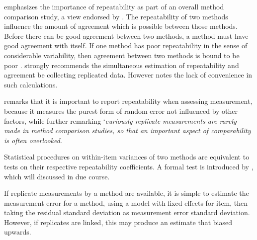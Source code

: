 \documentclass[12pt, a4paper]{report}
\theoremstyle{plain}
\theoremstyle{definition}
\theoremstyle{remark}
\begin{document}


\citet{Barnhart} emphasizes the importance of repeatability as part of an overall method comparison study, a view endorsed by \citet{BXC2008}. The repeatability of two methods influence the amount of agreement which is possible between those methods. Before there can be good agreement between two methods, a method must have good agreement with itself. If one method has poor repeatability in the sense of considerable variability, then agreement between two methods is bound to be poor \citep{Ba99, ARoy2009}.
\citet{BA99} strongly recommends the simultaneous estimation of repeatability and agreement be collecting replicated data.
However \citet{ARoy2009} notes the lack of convenience in such calculations. 

% 

	

	\citet{Barnhart} remarks that it is important to report repeatability when assessing
	measurement, because it measures the purest form of random error
	not influenced by other factors, while further remarking `\textit{curiously replicate measurements are rarely made in method comparison studies, so that an important aspect of comparability is often overlooked}. 
	
	
		
Statistical procedures on within-item variances of two methods are equivalent to tests on their respective repeatability coefficients. A formal test is introduced by \citet{ARoy2009}, which will discussed in due course.
		
	
	If replicate measurements by a method are available, it is simple to estimate the measurement error for a method, using a model with fixed effects for item, then taking the residual standard deviation as measurement error standard deviation. However, if replicates are linked, this may produce an estimate that biased upwards.
	
	

	
	

		
	
	
	
	
	
\end{document}
